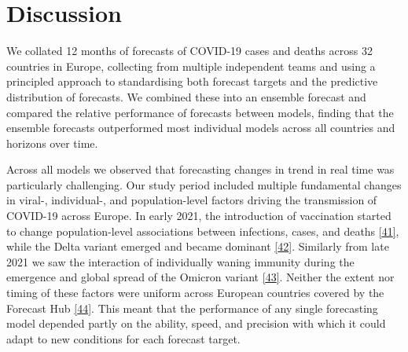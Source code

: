 \documentclass[
]{article}
\providecommand{\DIFaddbegin}{} %
\providecommand{\DIFaddend}{} %
\providecommand{\DIFdelbegin}{} %
\providecommand{\DIFdelend}{} %
\newcommand{\DIFscaledelfig}{0.5}
\newlength{\DIFdelgraphicswidth} %
\newlength{\DIFdelgraphicsheight} %
\newcommand{\DIFaddincludegraphics}[2][]{{\color{blue}\fbox{\DIFOincludegraphics[#1]{#2}}}} %
\newcommand{\DIFdelincludegraphics}[2][]{%
\sbox{\DIFdelgraphicsbox}{\DIFOincludegraphics[#1]{#2}}%
\settoboxwidth{\DIFdelgraphicswidth}{\DIFdelgraphicsbox} %
\settoboxtotalheight{\DIFdelgraphicsheight}{\DIFdelgraphicsbox} %
\scalebox{\DIFscaledelfig}{%
\parbox[b]{\DIFdelgraphicswidth}{\usebox{\DIFdelgraphicsbox}\\[-\baselineskip] \rule{\DIFdelgraphicswidth}{0em}}\llap{\resizebox{\DIFdelgraphicswidth}{\DIFdelgraphicsheight}{%
\setlength{\unitlength}{\DIFdelgraphicswidth}%
\begin{picture}(1,1)%
\thicklines\linethickness{2pt} %
{\color[rgb]{1,0,0}\put(0,0){\framebox(1,1){}}}%
{\color[rgb]{1,0,0}\put(0,0){\line( 1,1){1}}}%
{\color[rgb]{1,0,0}\put(0,1){\line(1,-1){1}}}%
\end{picture}%
}\hspace*{3pt}}} %
} %
\DeclareRobustCommand{\DIFaddbegin}{\DIFOaddbegin \let\includegraphics\DIFaddincludegraphics} %
\DeclareRobustCommand{\DIFaddend}{\DIFOaddend \let\includegraphics\DIFOincludegraphics} %
\DeclareRobustCommand{\DIFdelbegin}{\DIFOdelbegin \let\includegraphics\DIFdelincludegraphics} %
\DeclareRobustCommand{\DIFdelend}{\DIFOaddend \let\includegraphics\DIFOincludegraphics} %
\begin{document}
\hypertarget{discussion}{%
\section{Discussion}\label{discussion}}

We collated 12 months of forecasts of COVID-19 cases and deaths across 32 countries in Europe, collecting from multiple independent teams and using a principled approach to standardising both forecast targets and the predictive distribution of forecasts. We combined these into an ensemble forecast and compared the relative performance of forecasts between models, finding that the ensemble forecasts outperformed most individual models across all countries and horizons over time.

Across all models we observed that forecasting changes in trend in real time was particularly challenging. Our study period included multiple fundamental changes in viral-, individual-, and population-level factors driving the transmission of COVID-19 across Europe. In early 2021, the introduction of vaccination started to change population-level associations between infections, cases, and deaths \protect\DIFdelbegin %
\DIFdelend \DIFaddbegin \hyperlink{ref-europeancentrefordiseasepreventionandcontrolInterimGuidanceBenefits2021}{{[}41{]}}\DIFaddend , while the Delta variant emerged and became dominant \protect\DIFdelbegin %
\DIFdelend \DIFaddbegin \hyperlink{ref-europeancentrefordiseasepreventionandcontrolThreatAssessmentBrief2021}{{[}42{]}}\DIFaddend . Similarly from late 2021 we saw the interaction of individually waning immunity during the emergence and global spread of the Omicron variant \protect\DIFdelbegin %
\DIFdelend \DIFaddbegin \hyperlink{ref-europeancentrefordiseasepreventionandcontrolAssessmentFurtherSpread2022}{{[}43{]}}\DIFaddend . Neither the extent nor timing of these factors were uniform across European countries covered by the Forecast Hub \protect\DIFdelbegin %
\DIFdelend \DIFaddbegin \hyperlink{ref-europeancentrefordiseasepreventionandcontrolOverviewImplementationCOVID192021}{{[}44{]}}\DIFaddend . This meant that the performance of any single forecasting model depended partly on the ability, speed, and precision with which it could adapt to new conditions for each forecast target.
\end{document}
